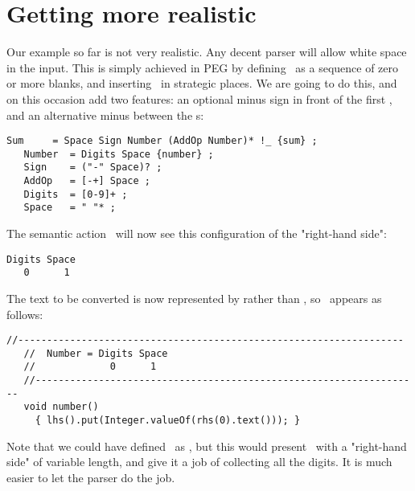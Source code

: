 
\section{Getting more realistic}


Our example so far is not very realistic.
Any decent parser will allow white space in the input.
This is simply achieved in PEG by defining \Space\
as a sequence of zero or more blanks,
and inserting \Space\ in strategic places.
We are going to do this, and on this occasion add two features:
an optional minus sign in front of the first \Number,
and an alternative minus between the \Number s:

\small
\begin{Verbatim}[frame=single,framesep=2mm,samepage=true,xleftmargin=15mm,xrightmargin=15mm,baselinestretch=0.8]
   Sum     = Space Sign Number (AddOp Number)* !_ {sum} ;
   Number  = Digits Space {number} ; 
   Sign    = ("-" Space)? ;
   AddOp   = [-+] Space ;
   Digits  = [0-9]+ ;
   Space   = " "* ;
\end{Verbatim}
\normalsize

The semantic action \Numbera\ will now see this configuration
of the "right-hand side":

\small
\begin{Verbatim}[samepage=true,xleftmargin=15mm,baselinestretch=0.9]
 Digits Space
   0      1
\end{Verbatim}
\normalsize

The text to be converted is now represented by  rather than ,
so \Numbera\ appears as follows:

\small
\begin{Verbatim}[frame=single,framesep=2mm,samepage=true,xleftmargin=15mm,xrightmargin=15mm,baselinestretch=0.8]
   //-------------------------------------------------------------------
   //  Number = Digits Space
   //             0      1
   //-------------------------------------------------------------------
   void number()
     { lhs().put(Integer.valueOf(rhs(0).text())); }
\end{Verbatim}
\normalsize

Note that we could have defined \Number\ as ,
but this would present \Numbera\ with a "right-hand side" of variable length,
and give it a job of collecting all the digits.
It is much easier to let the parser do the job.

